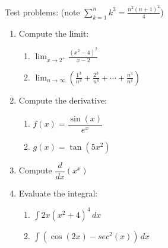\documentclass[12pt]{article}
\newcommand{\di}{\displaystyle}
\begin{document}
Test problems: (note $\di \sum_{k=1}^n k^3=\frac{n^2(n+1)^2}{4}$)
  \begin{enumerate}
    \item Compute the limit:
    \begin{multicols}{2}
    \begin{enumerate}
    \item $\di \lim_{x\to 2^+}\frac{(x^2-4)^2}{x-2}$

    
    \item $\di \lim_{n\to\infty}\left(\frac{1^3}{n^4}+\frac{2^3}{n^4}+\cdots + \frac{n^3}{n^4}\right)$ 
    \end{enumerate}
\end{multicols}

    \vspace{2cm}

    \item Compute the derivative:
    \begin{multicols}{2}
    \begin{enumerate}
    \item $f(x) = \dfrac{\sin(x)}{e^x}$
    

    
    \item $\di g(x)= \tan(5x^2)$
    
  
    
    
    \end{enumerate}
    \end{multicols}
    
    \vspace{2cm}
    
    \item Compute $\dfrac{d}{dx}(x^x)$
    
    \vspace{2cm}
    
    \item Evaluate the integral:
    \begin{multicols}{2}
    \begin{enumerate}
    \item $\di\int 2x(x^2+4)^4\,dx$
    

    
    \item $\di\int(\cos(2x)-sec^2(x))\,dx$
    

    \end{enumerate}
    \end{multicols}
    
    \vspace{2cm}
    

\end{enumerate}
\end{document}
